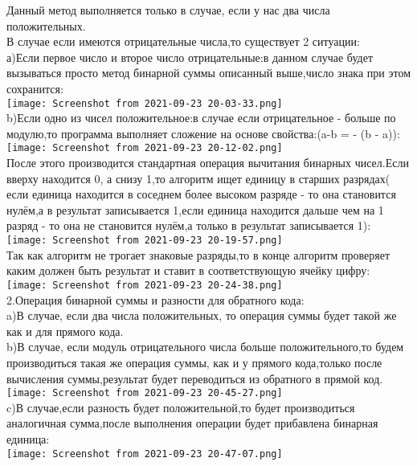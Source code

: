 \documentclass[a4paper,11pt]{article}
\begin{document}
\begin{flushleft}
Данный метод выполняется только в случае, если у нас два числа положительных. \\
В случае если имеются отрицательные числа,то существует 2 ситуации: \\
а)Если первое число и второе число отрицательные:в данном случае будет вызываться просто метод бинарной суммы описанный выше,число знака при этом сохранится: \\
\texttt{[image: Screenshot from 2021-09-23 20-03-33.png]} \\
b)Если одно из чисел положительное:в случае если отрицательное - больше по модулю,то программа выполняет сложение на основе свойства:(a-b = - (b - a)): \\
\texttt{[image: Screenshot from 2021-09-23 20-12-02.png]} \\
После этого производится стандартная операция вычитания бинарных чисел.Если вверху находится 0, а снизу 1,то алгоритм ищет единицу в старших разрядах( если единица находится в соседнем более высоком разряде - то она становится нулём,а в результат записывается 1,если единица находится дальше чем на 1 разряд - то она не становится нулём,а только в результат записывается 1):\\ 
\texttt{[image: Screenshot from 2021-09-23 20-19-57.png]} \\ 
Так как алгоритм не трогает знаковые разряды,то в конце алгоритм проверяет каким должен быть результат и ставит в соответствующую ячейку цифру: \\
\texttt{[image: Screenshot from 2021-09-23 20-24-38.png]} \\
2.Операция бинарной суммы и разности для обратного кода: \\ a)В случае, если два числа положительных, то операция суммы будет такой же как и для прямого кода. \\
b)В случае, если модуль отрицательного числа больше положительного,то будем производиться такая же операция суммы, как и у прямого кода,только после вычисления суммы,результат будет переводиться из обратного в прямой код. \\
\texttt{[image: Screenshot from 2021-09-23 20-45-27.png]} \\
c)В случае,если разность будет положительной,то будет производиться аналогичная сумма,после выполнения операции будет прибавлена бинарная единица: \\
\texttt{[image: Screenshot from 2021-09-23 20-47-07.png]}
\\

\end{flushleft}
\end{document}
